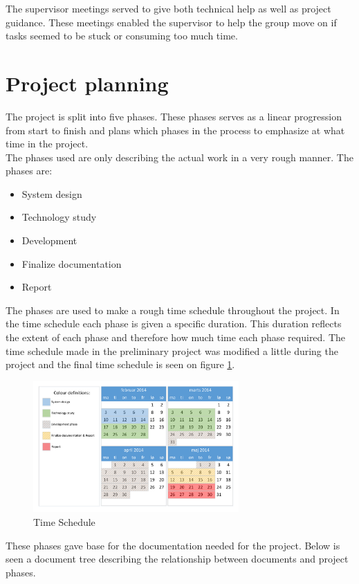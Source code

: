 The supervisor meetings served to give both technical help as well as project guidance. These meetings enabled the supervisor to help the group move on if tasks seemed to be stuck or consuming too much time.

\section{Project planning}
The project is split into five phases. These phases serves as a linear progression from start to finish and plans which phases in the process to emphasize at what time in the project.\\
The phases used are only describing the actual work in a very rough manner. The phases are:
\begin{itemize}
	\item System design 
	\item Technology study 
	\item Development 
	\item Finalize documentation 
	\item Report 
	\label{it:phases}
\end{itemize}

The phases are used to make a rough time schedule throughout the project. In the time schedule each phase is given a specific duration. This duration reflects the extent of each phase and therefore how much time each phase required. The time schedule made in the preliminary project was modified a little during the project and the final time schedule is seen on figure \ref{fig:TimeSched}.

\begin{figure}[hbpt]
	\centering
	\includegraphics[width=0.7\textwidth]{billeder/9projectexecution/Timeschedule_neat}
	\caption{Time Schedule}
	\label{fig:TimeSched}
\end{figure}

These phases gave base for the documentation needed for the project. Below is seen a document tree describing the relationship between documents and project phases.

